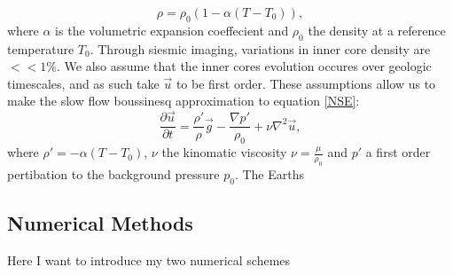 \documentclass{article}
\begin{document}
\begin{equation}
	\rho = \rho_0 (1- \alpha(T - T_0)),
	\label{equation of state}
\end{equation}
where $\alpha$ is the volumetric expansion coeffecient and $\rho_0$ the density at a reference temperature $T_0$.
Through siesmic imaging, variations in inner core density are $<< 1 \%$. We also assume that the inner cores evolution occures over geologic timescales, and as such take $\vec{u}$ to be first order. These assumptions allow us to make the slow flow boussinesq approximation to equation \ref{NSE}:
\begin{equation}
	\frac{\partial \vec{u}}{\partial t} = \frac{\rho'}{\rho} \vec{g} -   \frac{\nabla p'}{\rho_0} + \nu \nabla^2 \vec{u},
	\label{NSE slow + boussinesq}
\end{equation}
where $\rho'=-\alpha(T - T_0)$, $\nu$ the kinomatic viscosity $\nu = \frac{\mu}{\rho_0}$ and $p'$ a first order pertibation to the background pressure $p_0$.
\newline
The Earths











\subsection*{Numerical Methods}
Here I want to introduce my two numerical schemes
\end{document}
